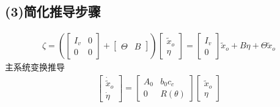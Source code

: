 \documentclass[a4paper,12pt]{article}
\begin{document}
\subsection*{(3)简化推导步骤}
\begin{align*}
    \zeta = \left(
    \begin{bmatrix}
        I_{v} & 0 \\
        0 & 0
    \end{bmatrix} + 
    \left[
    \begin{array}{c|c}
    \Theta & B 
    \end{array}
    \right]      
    \right)
    \begin{bmatrix}
        \tilde{x}_o \\ \eta 
    \end{bmatrix} =     
    \begin{bmatrix}I_{v} \\ 0 \end{bmatrix} \tilde{x}_o 
    + B \eta 
    + \Theta \tilde{x}_o
\end{align*}
主系统变换推导
\begin{align*}
    \begin{bmatrix}
        \dot{\tilde{x}}_o \\ \dot{\eta} 
    \end{bmatrix}
    =    \begin{bmatrix}
        A_0 & b_0c_c \\
        0 & R(\theta)
    \end{bmatrix}
    \begin{bmatrix}
        \tilde{x}_o \\ \eta 
    \end{bmatrix}
\end{align*}
\end{document}
